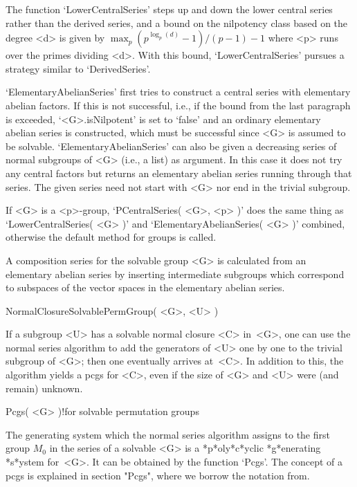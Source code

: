 The function `LowerCentralSeries'  steps up  and  down the lower  central
series rather  than the derived  series, and  a  bound on  the nilpotency
class based on the degree <d> is given by $\max_p (p^{\log_p(d)}-1)/(p-1)
- 1$  where <p>  runs over  the  primes dividing  <d>. With   this bound,
`LowerCentralSeries' pursues a strategy similar to `DerivedSeries'.

`ElementaryAbelianSeries' first tries to  construct a central series with
elementary abelian factors. If this is not successful, i.e., if the bound
from the last paragraph is exceeded, `<G>.isNilpotent'  is set to `false'
and  an ordinary elementary abelian  series is constructed, which must be
successful since <G> is assumed to be solvable. `ElementaryAbelianSeries'
can also be given a decreasing series of normal subgroups of <G> (i.e., a
list) as argument. In this case  it does not  try any central factors but
returns an  elementary abelian series   running through that  series. The
given series need not start with <G> nor end in the trivial subgroup.

If <G> is a  <p>-group, `PCentralSeries( <G>, <p>  )' does the same thing
as  `LowerCentralSeries(   <G> )'  and  `ElementaryAbelianSeries( <G>  )'
combined, otherwise the default method for groups is called.

A composition  series for the  solvable group  <G> is calculated  from an
elementary abelian   series  by  inserting  intermediate subgroups  which
correspond to  subspaces of the vector spaces  in the  elementary abelian
series.

\>NormalClosureSolvablePermGroup( <G>, <U> )

If a subgroup <U>  has a solvable normal  closure <C> in~<G>, one can use
the  normal series algorithm to  add the generators of <U>  one by one to
the trivial  subgroup of <G>;   then  one eventually arrives  at~<C>.  In
addition to this, the algorithm yields  a pcgs for  <C>, even if the size
of <G> and <U> were (and remain) unknown.


\>Pcgs( <G> )!{for solvable permutation groups}

The generating  system which the  normal series algorithm assigns  to the
first group  $M_0$ in the series of   a solvable <G>  is a *p*oly*c*yclic
*g*enerating *s*ystem for~<G>. It can be obtained by the function `Pcgs'.
The concept of a pcgs is explained in section "Pcgs", where we borrow the
notation from.

